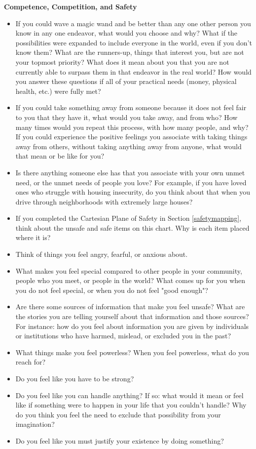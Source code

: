 \documentclass[12pt,letterpaper]{article}
\begin{document}
\noindent \textbf{Competence, Competition, and Safety}
\begin{itemize}
    \item If you could wave a magic wand and be better than any one other person you know in any one endeavor, what would you choose and why? What if the possibilities were expanded to include everyone in the world, even if you don't know them? What are the runners-up, things that interest you, but are not your topmost priority? What does it mean about you that you are not currently able to surpass them in that endeavor in the real world? How would you answer these questions if all of your practical needs (money, physical health, etc.) were fully met?
    \item If you could take something away from someone because it does not feel fair to you that they have it, what would you take away, and from who? How many times would you repeat this process, with how many people, and why? If you could experience the positive feelings you associate with taking things away from others, without taking anything away from anyone, what would that mean or be like for you?
    \item Is there anything someone else has that you associate with your own unmet need, or the unmet needs of people you love? For example, if you have loved ones who struggle with housing insecurity, do you think about that when you drive through neighborhoods with extremely large houses?
    \item If you completed the Cartesian Plane of Safety in Section \ref{safetymapping}, think about the unsafe and safe items on this chart. Why is each item placed where it is?
    \item Think of things you feel angry, fearful, or anxious about. 
    \item What makes you feel special compared to other people in your community, people who you meet, or people in the world? What comes up for you when you do not feel special, or when you do not feel "good enough"?
    \item Are there some sources of information that make you feel unsafe? What are the stories you are telling yourself about that information and those sources? For instance: how do you feel about information you are given by individuals or institutions who have harmed, mislead, or excluded you in the past?
    \item What things make you feel powerless? When you feel powerless, what do you reach for?
    \item Do you feel like you have to be strong?
    \item Do you feel like you can handle anything? If so: what would it mean or feel like if something were to happen in your life that you couldn't handle? Why do you think you feel the need to exclude that possibility from your imagination?
    \item Do you feel like you must justify your existence by doing something?
\end{itemize}
\end{document}
